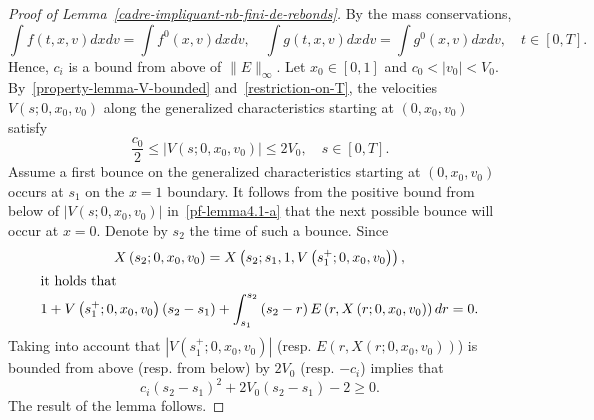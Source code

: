 \documentclass[10pt]{amsart}
\theoremstyle{definition}\newtheorem{defi}[theo]{Definition}\newtheorem{rema}[theo]{Remark}\newtheorem{exam}[theo]{Example}\newtheorem{exem}[theo]{Example}\newtheorem{nota}[theo]{Notation}
\begin{document}
\begin{proof}[{Proof of Lemma~\ref{cadre-impliquant-nb-fini-de-rebonds}}]
By the mass conservations,
\[
\int f(t,x,v)dxdv= \int f^0(x,v)dxdv, \quad \int g(t,x,v)dxdv= \int g^0(x,v)dxdv, \quad t\in [0,T].
\]
Hence, $c_i$ is a bound from above of $\|E\|_{\infty}$. Let $x_0 \in [0,1]$ and $c_0<|v_0|<V_0$. By~\eqref{property-lemma-V-bounded} and~\eqref{restriction-on-T}, the velocities $V(s;0,x_0,v_0)$ along the generalized characteristics starting at $(0,x_0,v_0)$ satisfy
\begin{equation}\label{pf-lemma4.1-a}
\frac{c_0}{2}\leq |V(s;0,x_0,v_0)| \leq 2V_0,\quad s\in [0,T].
\end{equation}
Assume a first bounce on the generalized characteristics starting at $(0,x_0,v_0)$ occurs at $s_1$ on the $x=1$ boundary. It follows from the positive bound from below of $|V(s;0,x_0,v_0)|$ in~\eqref{pf-lemma4.1-a} that the next possible bounce will occur at $x=0$. Denote by $s_2$ the time of such a bounce. Since
\begin{gather*}
X\left(s_2;0,x_0,v_0\right) = X\left(s_2;s_1,1,V\left(s_1^+;0,x_0,v_0\right)\right),
\\
\intertext{it holds that}
1+V\left(s_1^+;0,x_0,v_0\right)\left(s_2-s_1\right)+\int_{s_1}^{s_2}\left(s_2-r\right)E\left(r,X\left(r;0,x_0,v_0\right)\right)dr = 0.
\end{gather*}
Taking into account that $| V(s_1^+;0,x_0,v_0)| $ (resp. $E(r,X(r;0,x_0,v_0))$) is bounded from above (resp. from below) by $2V_0$ (resp. $-c_i$) implies that
\[
c_i\left(s_2-s_1\right)^2+2V_0\left(s_2-s_1\right)-2\geq 0.
\]
The result of the lemma follows.
\end{proof}
\end{document}
